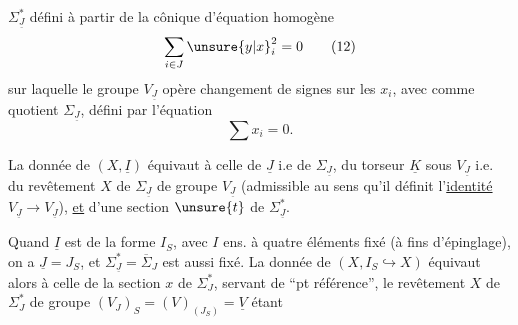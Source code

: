 $\Sigma^*_{\underline J}$ défini  à partir de  la cônique  d'équation homogène
\[
 \sum_{i\in J}\unsure{y|x}_i^2=0 \tag*{(12)}
\]
sur laquelle le groupe $V_{\underline J}$  opère   changement de signes sur les $x_i$, avec comme quotient $\Sigma_{\underline J}$, défini par l'équation 
\[
 \sum x_i=0 . \tag*{(13)}
\]

 La donnée de $(X,\underline I)$ équivaut à celle de \deleted{$\unsure{\Sigma}$} $\underline J$ i.e de $\Sigma_{\underline J}$, du torseur $\underline K$ sous $V_{\underline J}$ i.e. du revêtement  $X$ de $\Sigma_{\underline J}$  de groupe $V_{\underline J}$ (admissible au sens qu'il définit l'\uline{identité} $V_{\underline J}\longrightarrow V_{\underline J}$), \uline{et} d'une section $\unsure{t}$ de $\Sigma_{\underline J}^*$.

Quand $\underline I$ est  de la forme $I_S$,  avec $I$ ens. à quatre éléments fixé (à fins d'épinglage), on a $\underline J=J_S$, et $\Sigma_{\underline J}^*=\overline\Sigma_J$ est aussi fixé. La donnée de $(X,I_S\hookrightarrow X)$ équivaut alors à celle de la section $x$ de $\Sigma_J^*$, servant de ``pt référence'', le revêtement $X$ de $\Sigma_J^*$ de groupe $(V_J)_S=(V)_{(J_S)}=\underline V$ étant
